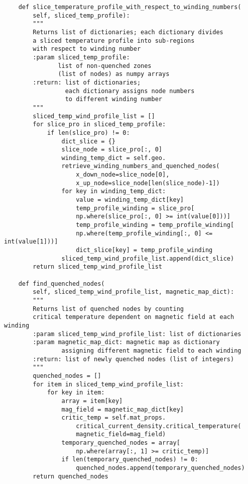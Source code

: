 \begin{verbatim}
    def slice_temperature_profile_with_respect_to_winding_numbers(
        self, sliced_temp_profile):
        """
        Returns list of dictionaries; each dictionary divides 
        a sliced temperature profile into sub-regions
        with respect to winding number
        :param sliced_temp_profile: 
               list of non-quenched zones 
               (list of nodes) as numpy arrays
        :return: list of dictionaries; 
                 each dictionary assigns node numbers 
                 to different winding number
        """
        sliced_temp_wind_profile_list = []
        for slice_pro in sliced_temp_profile:
            if len(slice_pro) != 0:
                dict_slice = {}
                slice_node = slice_pro[:, 0]
                winding_temp_dict = self.geo.
                retrieve_winding_numbers_and_quenched_nodes(
                    x_down_node=slice_node[0], 
                    x_up_node=slice_node[len(slice_node)-1])
                for key in winding_temp_dict:
                    value = winding_temp_dict[key]
                    temp_profile_winding = slice_pro[
                    np.where(slice_pro[:, 0] >= int(value[0]))]
                    temp_profile_winding = temp_profile_winding[
                    np.where(temp_profile_winding[:, 0] <= int(value[1]))]
                    dict_slice[key] = temp_profile_winding
                sliced_temp_wind_profile_list.append(dict_slice)
        return sliced_temp_wind_profile_list

    def find_quenched_nodes(
        self, sliced_temp_wind_profile_list, magnetic_map_dict):
        """
        Returns list of quenched nodes by counting 
        critical temperature dependent on magnetic field at each winding
        :param sliced_temp_wind_profile_list: list of dictionaries
        :param magnetic_map_dict: magnetic map as dictionary 
                assigning different magnetic field to each winding
        :return: list of newly quenched nodes (list of integers)
        """
        quenched_nodes = []
        for item in sliced_temp_wind_profile_list:
            for key in item:
                array = item[key]
                mag_field = magnetic_map_dict[key]
                critic_temp = self.mat_props.
                    critical_current_density.critical_temperature(
                    magnetic_field=mag_field)
                temporary_quenched_nodes = array[
                    np.where(array[:, 1] >= critic_temp)]
                if len(temporary_quenched_nodes) != 0:
                    quenched_nodes.append(temporary_quenched_nodes)
        return quenched_nodes


\end{verbatim}
